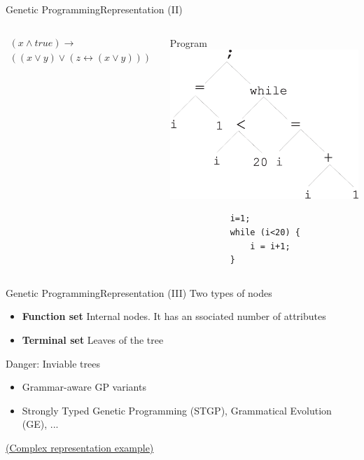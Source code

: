 \documentclass[10pt,compress]{beamer} %
\begin{document}
\begin{frame}[fragile]{Genetic Programming}{Representation (II)}
\begin{columns}
\begin{center}
			\begin{multline*}
			(x	\wedge true) \to \\((x \vee y) \vee (z \leftrightarrow (x\vee y)))
			\end{multline*}	
			\end{center}
	   		\begin{center}
	    	Program
			\includegraphics[width=\linewidth]{figs/programtree.eps}\\
			\begin{verbatim}
			i=1;
			while (i<20) {
				i = i+1;
			}
			\end{verbatim}	
			\end{center}
	\end{columns}
\end{frame}

\begin{frame}[fragile]{Genetic Programming}{Representation (III)}
	Two types of nodes
	\begin{itemize}
		\item \textbf{Function set} Internal nodes. It has an ssociated number of attributes
		\item \textbf{Terminal set} Leaves of the tree
	\end{itemize}
	Danger: Inviable trees
	\begin{itemize}
		\item Grammar-aware GP variants
		\item Strongly Typed Genetic Programming (STGP), Grammatical Evolution (GE), ...
	\end{itemize}
	\href{http://www.genetic-programming.com/gpcircuitanimation.gif}{(Complex representation example)}
\end{frame}
\end{document}
